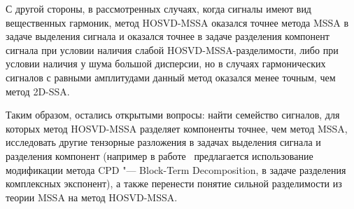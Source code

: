 \documentclass[specialist,
    substylefile = spbu.rtx,
    subf,href,colorlinks=true, 12pt]{disser}
\theoremstyle{plain}
\theoremstyle{definition}
\theoremstyle{remark}
\begin{document}
    С другой стороны, в рассмотренных случаях, когда сигналы имеют вид вещественных гармоник, метод HOSVD-MSSA оказался 
    точнее метода MSSA в задаче выделения сигнала и оказался точнее в задаче разделения компонент сигнала
    при условии наличия слабой HOSVD-MSSA-разделимости, либо при условии наличия у шума большой дисперсии, но в
    случаях гармонических сигналов с равными амплитудами данный метод оказался менее точным, чем метод 2D-SSA.

    Таким образом, остались открытыми вопросы: найти семейство сигналов, для которых метод HOSVD-MSSA 
    разделяет компоненты точнее, чем метод MSSA, исследовать другие тензорные разложения в задачах выделения сигнала
    и разделения компонент (например в работе~\cite{cpd-separation} предлагается использование модификации метода CPD
    "--- Block-Term Decomposition, в задаче разделения комплексных экспонент), а также
    перенести понятие сильной разделимости из теории MSSA на метод HOSVD-MSSA.

    
    
\end{document}
